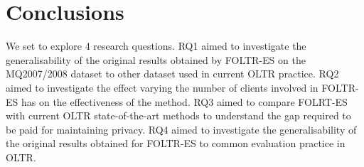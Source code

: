 \section{Conclusions}

We set to explore 4 research questions. RQ1 aimed to investigate the generalisability of the original results obtained  by FOLTR-ES on the MQ2007/2008 dataset to other dataset used in current OLTR practice. 
RQ2 aimed to investigate the effect varying the number of clients involved in FOLTR-ES has on the effectiveness of the method. 
RQ3 aimed to compare FOLRT-ES with current OLTR state-of-the-art methods to understand the gap required to be paid for maintaining privacy. 
RQ4 aimed to investigate the generalisability of the original results obtained for FOLTR-ES to common evaluation practice in OLTR. 